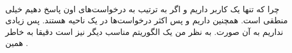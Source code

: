 \\\noindent
چرا که تنها یک کاربر داریم و اگر به ترتیب به درخواست‌های اون پاسخ دهیم خیلی منطقی است.
همچنین
داریم و پس اکثر درخواست‌ها در یک ناحیه هستند. پس
زیادی نداریم به آن صورت.
به نظر من یک الگوریتم مناسب دیگر نیز 
است دقیقا به خاطر همین
.


